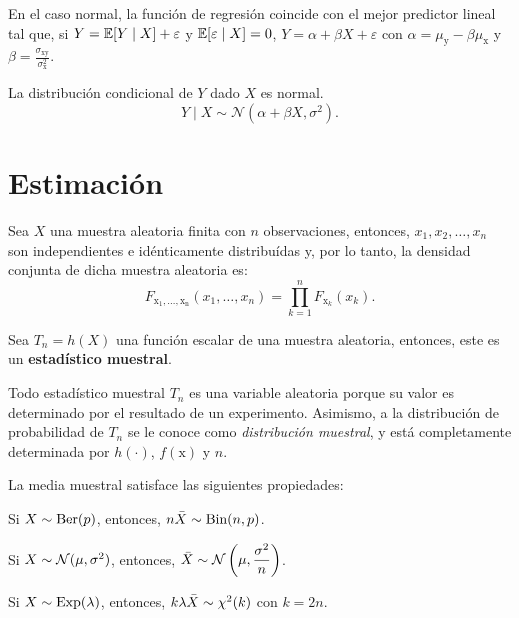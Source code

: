 \documentclass[8pt,a4paper]{extarticle}
\begin{document}
\begin{multicols}{3}
	\begin{boxrmk}
		En el caso normal, la función de regresión coincide con el mejor predictor lineal tal que, si $Y = \mathbb{E}[ Y \mid X ] + \varepsilon$ y $\mathbb{E}[ \varepsilon \mid X ] = 0$, $Y = \alpha + \beta X + \varepsilon$ con $\alpha = \mu_{\mathrm{y}} - \beta \mu_{\mathrm{x}}$ y $\displaystyle \beta = \frac{\sigma_{\mathrm{xy}}}{\sigma^2_{\mathrm{x}}}$.
	\end{boxrmk}

	\begin{boxprop}
		La distribución condicional de $Y$ dado $X$ es normal.
		\[Y \mid X \sim \mathcal{N} (\alpha + \beta X, \sigma^2).\]
	\end{boxprop}

	\newpage
	\section{Estimación}

	\begin{boxtheo}
		Sea $X$ una muestra aleatoria finita con $n$ observaciones, entonces, $x_1, x_2, \dots, x_n$ son independientes e idénticamente distribuídas y, por lo tanto, la densidad conjunta de dicha muestra aleatoria es:
		\[F_{\mathrm{x_1,\ldots,x_n}}(x_1,\ldots,x_n) = \prod_{k = 1}^{n} F_{\mathrm{x}_k} (x_k).\]
	\end{boxtheo}

	\begin{boxdef}
		Sea $T_n = h(X)$ una función escalar de una muestra aleatoria, entonces, este es un \textbf{estadístico muestral}.
	\end{boxdef}

	\begin{boxrmk}
		Todo estadístico muestral $T_n$ es una variable aleatoria porque su valor es determinado por el resultado de un experimento. Asimismo, a la distribución de probabilidad de $T_n$ se le conoce como \emph{distribución muestral}, y está completamente determinada por $h(\cdot)$, $f(\mathrm{x})$ y $n$.
	\end{boxrmk}

	\begin{boxprop}
		La media muestral satisface las siguientes propiedades:
		\begin{bulletlist}
			\item Si $X \sim \text{\normalfont Ber}(p)$, entonces, $n\bar{X} \sim \text{\normalfont Bin}(n,p)$.
			\item Si $X \sim \mathcal{N}(\mu, \sigma^2)$, entonces, $\displaystyle \bar{X} \sim \mathcal{N}\left(\mu,\frac{\sigma^2}{n}\right)$.
			\item Si $X \sim \text{\normalfont Exp}(\lambda)$, entonces, $k\lambda\bar{X} \sim \chi^2 (k)$ con $k = 2n$.
		\end{bulletlist}
	\end{boxprop}


\end{multicols}
\end{document}
